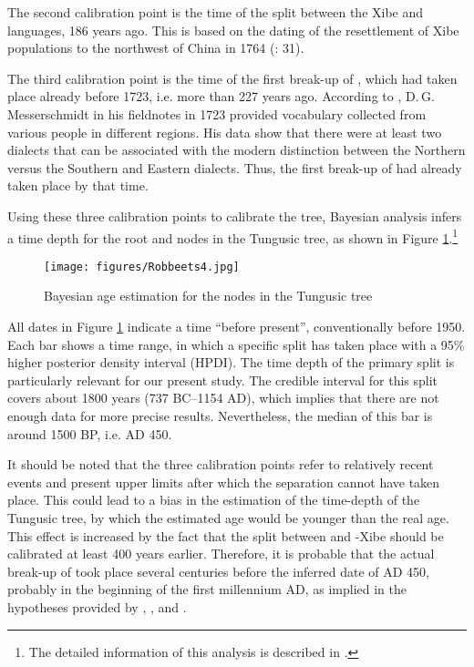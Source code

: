 \documentclass[output=paper,colorlinks,citecolor=brown]{langscibook}
\begin{document}
The second calibration point is the time of the split between the Xibe and  languages, 186 years ago. This is based on the dating of the resettlement of Xibe populations to the northwest of China in 1764 (\citealt{Gorelova2002}: 31).

The third calibration point is the time of the first break-up of , which had taken place already before 1723, i.e. more than 227 years ago. According to \citet{Vasilevic1969}, D.\,G. Messerschmidt in his fieldnotes in 1723 provided vocabulary collected from various  people in different regions. His data show that there were at least two dialects that can be associated with the modern distinction between the Northern versus the Southern and Eastern dialects. Thus, the first break-up of  had already taken place by that time.\largerpage

Using these three calibration points to calibrate the tree,  Bayesian analysis infers a time depth for the root and nodes in the Tungusic tree, as shown in Figure \ref{fig:8:4}.\footnote{The detailed information of this analysis is described in \citet{Oskolskayaetal2022}.}

\begin{figure}
\texttt{[image: figures/Robbeets4.jpg]}
\caption{Bayesian age estimation for the nodes in the Tungusic tree \citep{Oskolskayaetal2022}}
\label{fig:8:4}
\end{figure}

All dates in Figure \ref{fig:8:4} indicate a time “before present”, conventionally before 1950. Each bar shows a time range, in which a specific split has taken place with a 95\% higher posterior density interval (HPDI). The time depth of the primary split is particularly relevant for our present study. The credible interval for this split covers about 1800 years (737 BC--1154 AD), which implies that there are not enough data for more precise results. Nevertheless, the median of this bar is around 1500 BP, i.e. AD 450.

It should be noted that the three calibration points refer to relatively recent events and present upper limits after which the separation cannot have taken place. This could lead to a bias in the estimation of the time-depth of the Tungusic tree, by which the estimated age would be younger than the real age. This effect is increased by the fact that the split between  and -Xibe should be calibrated at least 400 years earlier. Therefore, it is probable that the actual break-up of  took place several centuries before the inferred date of AD 450, probably in the beginning of the first millennium AD, as implied in the hypotheses provided by \citet{Janhunen2012a}, \citet{Pevnov2012}, \citet{Robbeets2015} and \citet{Robbeetsetal2020}.
\end{document}
